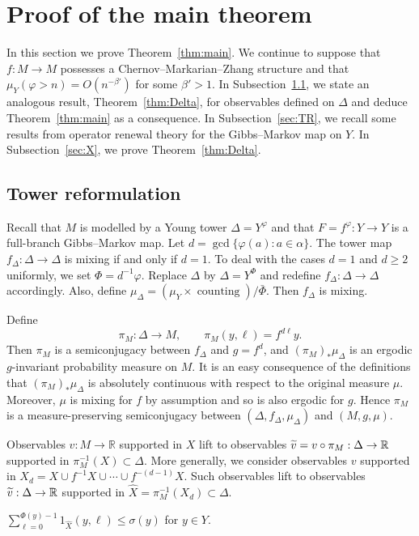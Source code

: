 \documentclass[10pt]{amsart}
\theoremstyle{definition}\newtheorem{defi}[theo]{Definition}\newtheorem{rema}[theo]{Remark}\newtheorem{exam}[theo]{Example}\newtheorem{exem}[theo]{Example}\newtheorem{nota}[theo]{Notation}
\newcommand{\R}{\mathbb{R}}
\DeclareMathOperator{\counting}{counting}
\newcommand{\hX}{\widehat{X}}
\newcommand{\tv}{\tilde{v}}
\newcommand{\bPhi}{\bar{\Phi}}
\let\oldtilde\tilde
\renewcommand*{\tilde}[1]{\mathchoice{\widetilde{#1}}{\widetilde{#1}}{\oldtilde{#1}}{\oldtilde{#1}}}
\begin{document}
\section{Proof of the main theorem}\label{sec:proof}

In this section we prove Theorem~\ref{thm:main}. We continue to suppose that $f:M\to M$ possesses a Chernov--Markarian--Zhang structure and that $\mu_Y(\varphi>n)=O(n^{-\beta'})$ for some $\beta'>1$. In Subsection~\ref{sec:Delta}, we state an analogous result, Theorem~\ref{thm:Delta}, for observables defined on $\Delta$ and deduce Theorem~\ref{thm:main} as a consequence. In Subsection~\ref{sec:TR}, we recall some results from operator renewal theory for the Gibbs--Markov map on $Y$. In Subsection~\ref{sec:X}, we prove Theorem~\ref{thm:Delta}.

\subsection{Tower reformulation}\label{sec:Delta}

Recall that $M$ is modelled by a Young tower $\Delta=Y^\varphi$ and that $F=f^\varphi:Y\to Y$ is a full-branch Gibbs--Markov map. Let $d=\gcd\{\varphi(a):a\in\alpha\}$. The tower map $f_\Delta:\Delta\to\Delta$ is mixing if and only if $d=1$. To deal with the cases $d=1$ and $d\ge2$ uniformly, we set $\Phi=d^{-1}\varphi$. Replace $\Delta$ by $\Delta=Y^\Phi$ and redefine $f_\Delta:\Delta\to\Delta$ accordingly. Also, define $\mu_\Delta=(\mu_Y\times\counting)/\bPhi$. Then $f_\Delta$ is mixing.

Define
\[
\pi_M:\Delta\to M, \qquad \pi_M(y,\ell)=f^{d\ell}y.
\]
Then $\pi_M$ is a semiconjugacy between $f_\Delta$ and $g=f^d$, and $(\pi_M)_*\mu_\Delta$ is an ergodic $g$-invariant probability measure on $M$. It is an easy consequence of the definitions that $(\pi_M)_*\mu_\Delta$ is absolutely continuous with respect to the original measure $\mu$. Moreover, $\mu$ is mixing for $f$ by assumption and so is also ergodic for $g$. Hence $\pi_M$ is a measure-preserving semiconjugacy between $(\Delta,f_\Delta,\mu_\Delta)$ and $(M,g,\mu)$.

Observables $v:M\to\R$ supported in $X$ lift to observables $\tv=v\circ \pi_M:\Delta\to\R$ supported in $\pi_M^{-1}(X)\subset\Delta$. More generally, we consider observables $v$ supported in $X_d=X\cup f^{-1}X\cup\cdots\cup f^{-(d-1)}X$. Such observables lift to observables $\tv:\Delta\to\R$ supported in $\hX=\pi_M^{-1}(X_d)\subset\Delta$.

\begin{prop}\label{prop:hX}
$\sum_{\ell=0}^{\Phi(y)-1}1_{\hX}(y,\ell) \le \sigma(y)$ for $y\in Y$.
\end{prop}
\end{document}

